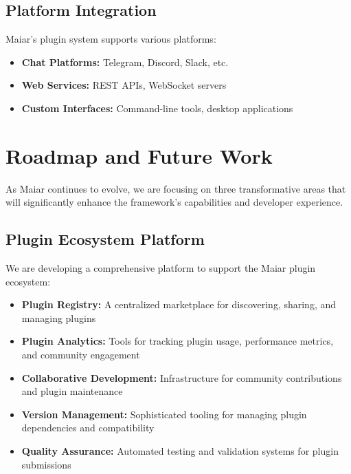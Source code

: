 \documentclass[12pt]{article}
\begin{document}
\subsection{Platform Integration}
Maiar's plugin system supports various platforms:
\begin{itemize}
    \item \textbf{Chat Platforms:} Telegram, Discord, Slack, etc.
    \item \textbf{Web Services:} REST APIs, WebSocket servers
    \item \textbf{Custom Interfaces:} Command-line tools, desktop applications
\end{itemize}

\section{Roadmap and Future Work}
As Maiar continues to evolve, we are focusing on three transformative areas that will significantly enhance the framework's capabilities and developer experience.

\subsection{Plugin Ecosystem Platform}
We are developing a comprehensive platform to support the Maiar plugin ecosystem:
\begin{itemize}
    \item \textbf{Plugin Registry:} A centralized marketplace for discovering, sharing, and managing plugins
    
    \item \textbf{Plugin Analytics:} Tools for tracking plugin usage, performance metrics, and community engagement
    
    \item \textbf{Collaborative Development:} Infrastructure for community contributions and plugin maintenance
    
    \item \textbf{Version Management:} Sophisticated tooling for managing plugin dependencies and compatibility
    
    \item \textbf{Quality Assurance:} Automated testing and validation systems for plugin submissions
\end{itemize}
\end{document}
